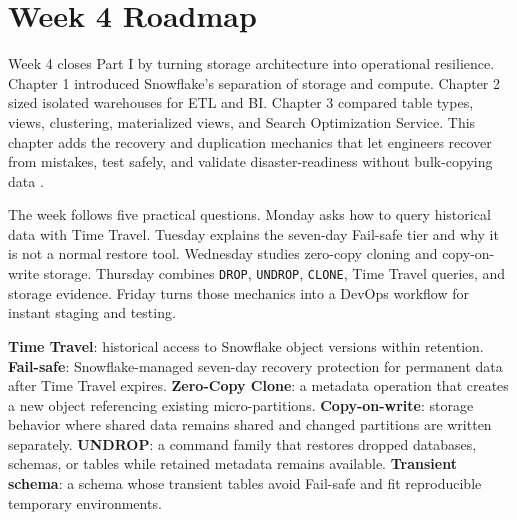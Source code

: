 \section{Week 4 Roadmap}
Week 4 closes Part I by turning storage architecture into operational resilience. Chapter 1 introduced Snowflake's separation of storage and compute. Chapter 2 sized isolated warehouses for ETL and BI. Chapter 3 compared table types, views, clustering, materialized views, and Search Optimization Service. This chapter adds the recovery and duplication mechanics that let engineers recover from mistakes, test safely, and validate disaster-readiness without bulk-copying data \cite{snowflakeTimeTravelDocs,snowflakeFailSafeDocs,snowflakeCloneDocs}.

The week follows five practical questions. Monday asks how to query historical data with Time Travel. Tuesday explains the seven-day Fail-safe tier and why it is not a normal restore tool. Wednesday studies zero-copy cloning and copy-on-write storage. Thursday combines \texttt{DROP}, \texttt{UNDROP}, \texttt{CLONE}, Time Travel queries, and storage evidence. Friday turns those mechanics into a DevOps workflow for instant staging and testing.
\begin{keyterms}
\textbf{Time Travel}: historical access to Snowflake object versions within retention.\quad
\textbf{Fail-safe}: Snowflake-managed seven-day recovery protection for permanent data after Time Travel expires.\quad
\textbf{Zero-Copy Clone}: a metadata operation that creates a new object referencing existing micro-partitions.\quad
\textbf{Copy-on-write}: storage behavior where shared data remains shared and changed partitions are written separately.\quad
\textbf{UNDROP}: a command family that restores dropped databases, schemas, or tables while retained metadata remains available.\quad
\textbf{Transient schema}: a schema whose transient tables avoid Fail-safe and fit reproducible temporary environments.
\end{keyterms}
